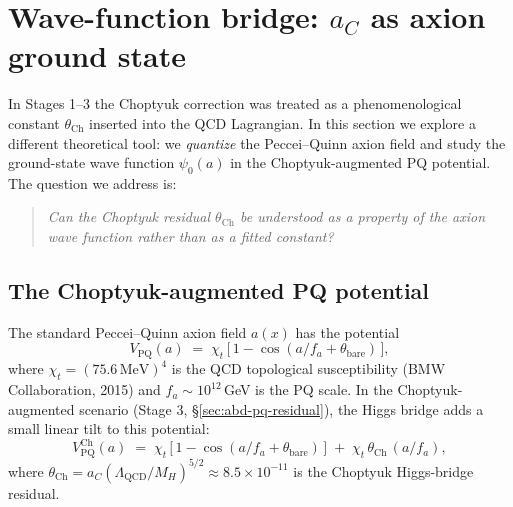 %
%

\section{Wave-function bridge: $a_C$ as axion ground state}
\label{sec:wavefunction-bridge}

In Stages 1--3 the Choptyuk correction was treated as a
phenomenological constant $\theta_\mathrm{Ch}$ inserted into the
QCD Lagrangian.  In this section we explore a different theoretical
tool: we \emph{quantize} the Peccei--Quinn axion field and study
the ground-state wave function $\psi_0(a)$ in the Choptyuk-augmented
PQ potential.  The question we address is:
\begin{quote}
\itshape
Can the Choptyuk residual $\theta_\mathrm{Ch}$ be understood as a
property of the axion \emph{wave function} rather than as a fitted
constant?
\end{quote}

\subsection{The Choptyuk-augmented PQ potential}

The standard Peccei--Quinn axion field $a(x)$ has the potential
\begin{equation}
V_\mathrm{PQ}(a) \;=\; \chi_t \,\bigl[\,1 - \cos(a/f_a + \theta_\mathrm{bare})\,\bigr],
\label{eq:VPQ-standard}
\end{equation}
where $\chi_t = (75.6\,\mathrm{MeV})^4$ is the QCD topological
susceptibility (BMW Collaboration, 2015) and $f_a \sim 10^{12}$\,GeV
is the PQ scale.  In the Choptyuk-augmented scenario (Stage 3,
\S\ref{sec:abd-pq-residual}), the Higgs bridge adds a small linear
tilt to this potential:
\begin{equation}
V_\mathrm{PQ}^\mathrm{Ch}(a) \;=\; \chi_t \,\bigl[\,1 - \cos(a/f_a + \theta_\mathrm{bare})\,\bigr]
\;+\; \chi_t\,\theta_\mathrm{Ch}\,(a/f_a),
\label{eq:VPQ-Choptyuk}
\end{equation}
where $\theta_\mathrm{Ch} = a_C (\Lambda_\mathrm{QCD}/M_H)^{5/2} \approx 8.5\times10^{-11}$
is the Choptyuk Higgs-bridge residual.


